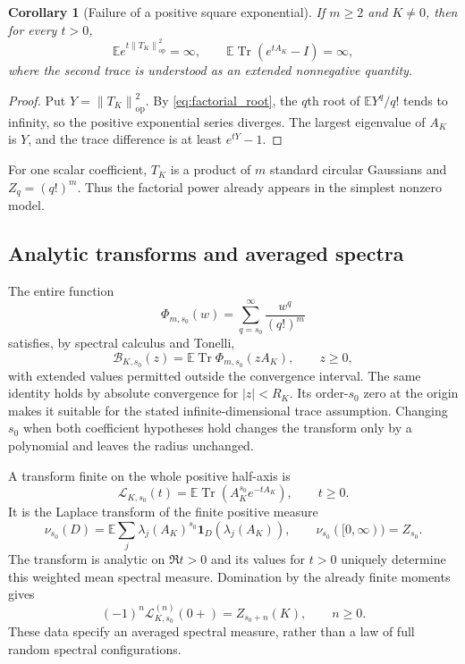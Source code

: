 \documentclass[11pt,a4paper]{amsart}
\numberwithin{equation}{section}
\newtheorem{corollary}[theorem]{Corollary}
\theoremstyle{definition}
\theoremstyle{remark}
\newcommand{\E}{\mathbb E}
\DeclareMathOperator{\Tr}{Tr}
\newcommand{\op}{\mathrm{op}}
\newcommand{\norm}[1]{\left\lVert#1\right\rVert}
\begin{document}
\begin{corollary}[Failure of a positive square exponential]\label{cor:positive_square_failure}
If $m\ge2$ and $K\ne0$, then for every $t>0$,
\[
 \E e^{t\norm{T_K}_{\op}^2}=\infty,\qquad
 \E\Tr(e^{tA_K}-I)=\infty,
\]
where the second trace is understood as an extended nonnegative quantity.
\end{corollary}
\begin{proof}
Put $Y=\norm{T_K}_{\op}^2$. By \eqref{eq:factorial_root}, the $q$th root of $\E Y^q/q!$ tends to infinity, so the positive exponential series diverges. The largest eigenvalue of $A_K$ is $Y$, and the trace difference is at least $e^{tY}-1$.
\end{proof}
For one scalar coefficient, $T_K$ is a product of $m$ standard circular Gaussians and $Z_q=(q!)^m$. Thus the factorial power already appears in the simplest nonzero model.

\subsection{Analytic transforms and averaged spectra}
The entire function
\[
 \Phi_{m,s_0}(w)=\sum_{q=s_0}^\infty\frac{w^q}{(q!)^m}
\]
satisfies, by spectral calculus and Tonelli,
\begin{equation}\label{eq:spectral_actual_function}
 \mathcal B_{K,s_0}(z)=\E\Tr\Phi_{m,s_0}(zA_K),\qquad z\ge0,
\end{equation}
with extended values permitted outside the convergence interval. The same identity holds by absolute convergence for $|z|<R_K$. Its order-$s_0$ zero at the origin makes it suitable for the stated infinite-dimensional trace assumption. Changing $s_0$ when both coefficient hypotheses hold changes the transform only by a polynomial and leaves the radius unchanged.

A transform finite on the whole positive half-axis is
\begin{equation}\label{eq:weighted_laplace}
 \mathcal L_{K,s_0}(t)=\E\Tr(A_K^{s_0}e^{-tA_K}),\qquad t\ge0.
\end{equation}
It is the Laplace transform of the finite positive measure
\begin{equation}\label{eq:weighted_mean_spectrum}
 \nu_{s_0}(D)=\E\sum_j\lambda_j(A_K)^{s_0}\mathbf1_D(\lambda_j(A_K)),
 \qquad \nu_{s_0}([0,\infty))=Z_{s_0}.
\end{equation}
The transform is analytic on $\Re t>0$ and its values for $t>0$ uniquely determine this weighted mean spectral measure. Domination by the already finite moments gives
\[
 (-1)^n\mathcal L_{K,s_0}^{(n)}(0+)=Z_{s_0+n}(K),\qquad n\ge0.
\]
These data specify an averaged spectral measure, rather than a law of full random spectral configurations.
\end{document}
